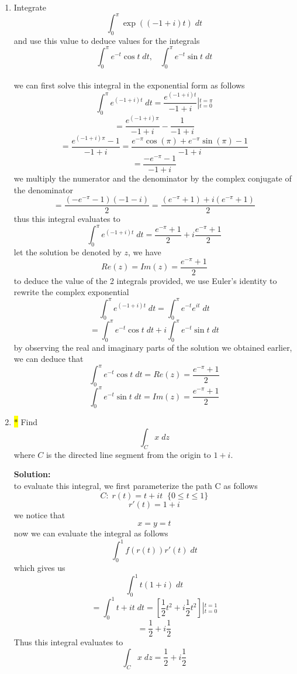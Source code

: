 \documentclass[12pt]{article}
\begin{document}
\begin{enumerate}
\item Integrate 
\[
\int_{0}^{\pi} \exp((-1+i)t) \; dt
\]
and use this value to deduce values for the integrals 
\[
\int_{0}^{\pi} e^{-t} \cos t \; dt, \;\;\;  \int_{0}^{\pi} e^{-t} \sin t \; dt
\]
\\
we can first solve this integral in the exponential form as follows
\[
\int_{0}^{\pi} e^{(-1+i)t}\; dt = \frac{e^{(-1+i)t}}{-1+i} \left|_{t=0}^{t=\pi} \right.
\]
\[
= \frac{e^{(-1+i)\pi}}{-1+i}- \frac{1}{-1+i}
\]
\[
=\frac{e^{(-1+i)\pi} -1}{-1+i} = \frac{e^{-\pi}\cos{(\pi)}+ e^{-\pi}\sin{(\pi)} -1}{-1+i}
\]
\[
=\frac{-e^{-\pi} -1}{-1+i}
\]
we multiply the numerator and the denominator by the complex conjugate of the denominator
\[
=\frac{(-e^{-\pi} -1)(-1-i)}{2}=\frac{(e^{-\pi}+1)+i(e^{-\pi}+1)}{2}
\]
thus this integral evaluates to\[
\int_{0}^{\pi} e^{(-1+i)t}\; dt = \frac{e^{-\pi}+1}{2} + i\frac{e^{-\pi}+1}{2}
\]
let the solution be denoted by $z$, we have\[
Re(z)=Im(z)=\frac{e^{-\pi}+1}{2}
\]
to deduce the value of the 2 integrals provided, we use Euler's identity to rewrite the complex exponential
\[
\int_{0}^{\pi} e^{(-1+i)t}\; dt = \int_{0}^{\pi} e^{-t}e^{it}\; dt
\]
\[
=\int_{0}^{\pi} e^{-t}\cos{t} \; dt + i\int_{0}^{\pi} e^{-t}\sin{t} \; dt
\]
by observing the real and imaginary parts of the solution we obtained earlier, we can deduce that
\[
\int_{0}^{\pi} e^{-t}\cos{t} \; dt = Re(z) = \frac{e^{-\pi}+1}{2}
\]
\[
\int_{0}^{\pi} e^{-t}\sin{t} \; dt = Im(z)=  \frac{e^{-\pi}+1}{2}
\]







    
    \item \colorbox{yellow}{$\ast$}  Find 
    \[
    \int_{C} x \; dz
    \]
    where $C$ is the directed line segment from the origin to $1+i$.
    

\textbf{Solution:}
\\
to evaluate this integral, we first parameterize the path C as follows
\[
C:\; r(t) = t+it \;\; \{0\leq t\leq 1\}
\]
\[
r'(t)=1+i
\]
we notice that\[
x=y=t
\]
now we can evaluate the integral as follows
\[
\int_{0}^{1} f(r(t))r'(t)\; dt
\]
which gives us
\[
\int_{0}^{1} t(1+i) \; dt
\]
\[
=\int_{0}^{1} t+it \; dt = \left[\frac{1}{2}t^2 + i\frac{1}{2}t^2 \right ] \left|_{t=0}^{t=1} \right.
\]
\[
=\frac{1}{2}+i\frac{1}{2}
\]
Thus this integral evaluates to \[
\int_{C} x \; dz = \frac{1}{2}+i\frac{1}{2}
\]


\newline





\end{enumerate}
\end{document}
